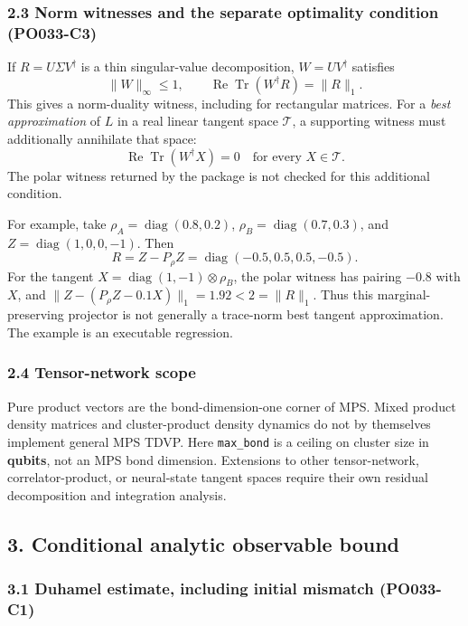 \documentclass[
]{article}
\begin{document}
\subsubsection{2.3 Norm witnesses and the separate optimality condition (PO033-C3)}\label{norm-witnesses-and-the-separate-optimality-condition-po033-c3}

If \(R=U\Sigma V^\dagger\) is a thin singular-value decomposition, \(W=UV^\dagger\) satisfies
\[
\|W\|_\infty\le1,\qquad
\operatorname{Re}\operatorname{Tr}(W^\dagger R)=\|R\|_1.
\]
This gives a norm-duality witness, including for rectangular matrices. For a \emph{best approximation} of \(L\) in a real linear tangent space \(\mathcal T\), a supporting witness must additionally annihilate that space:
\[
\operatorname{Re}\operatorname{Tr}(W^\dagger X)=0
\quad\text{for every }X\in\mathcal T.
\]
The polar witness returned by the package is not checked for this additional condition.

For example, take \(\rho_A=\operatorname{diag}(0.8,0.2)\),
\(\rho_B=\operatorname{diag}(0.7,0.3)\), and
\(Z=\operatorname{diag}(1,0,0,-1)\). Then
\[
R=Z-P_\rho Z=\operatorname{diag}(-0.5,0.5,0.5,-0.5).
\]
For the tangent \(X=\operatorname{diag}(1,-1)\otimes\rho_B\),
the polar witness has pairing \(-0.8\) with \(X\), and
\(\|Z-(P_\rho Z-0.1X)\|_1=1.92<2=\|R\|_1\).
Thus this marginal-preserving projector is not generally a trace-norm best tangent approximation. The example is an executable regression.

\subsubsection{2.4 Tensor-network scope}\label{tensor-network-scope}

Pure product vectors are the bond-dimension-one corner of MPS. Mixed product density matrices and cluster-product density dynamics do not by themselves implement general MPS TDVP. Here \texttt{max\_bond} is a ceiling on cluster size in \textbf{qubits}, not an MPS bond dimension. Extensions to other tensor-network, correlator-product, or neural-state tangent spaces require their own residual decomposition and integration analysis.

\subsection{3. Conditional analytic observable bound}\label{conditional-analytic-observable-bound}

\subsubsection{3.1 Duhamel estimate, including initial mismatch (PO033-C1)}\label{duhamel-estimate-including-initial-mismatch-po033-c1}
\end{document}
